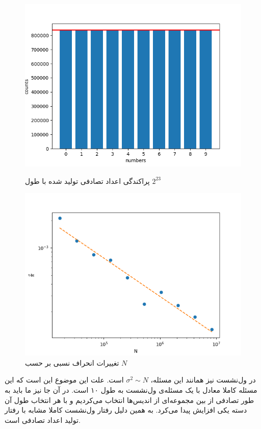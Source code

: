 \documentclass[11pt, a4paper]{article}
\begin{document}
\begin{figure}[h!]
	\centering
  \begin{minipage}[b]{0.48\textwidth}
    \includegraphics[width=\textwidth]{q1_histogram_14_24_2.png}
    \caption{پراکندگی اعداد تصادفی تولید شده با طول $2^{23}$}
    \label{fig:q1_histogram}
  \end{minipage}
  \hfill
  \begin{minipage}[b]{0.48\textwidth}
    \includegraphics[width=\textwidth]{q1_sigma_14_24_2.png}
    \caption{تغییرات انحراف نسبی بر حسب $N$}
    \label{fig:q1_sigma}
  \end{minipage}
\end{figure}

در ول‌نشست نیز همانند این مسئله،
$\sigma^2 \sim N$
است.
علت این موضوع این است که این مسئله کاملا معادل با یک مسئله‌ی ول‌نشست به طول ۱۰ است.
در آن جا نیز ما باید به طور تصادفی از بین مجموعه‌ای از اندیس‌ها انتخاب می‌کردیم و
با هر انتخاب طول آن دسته یکی افزایش پیدا می‌کرد.
به همین دلیل رفتار ول‌نشست کاملا مشابه با رفتار تولید اعداد تصادفی است.
\end{document}
